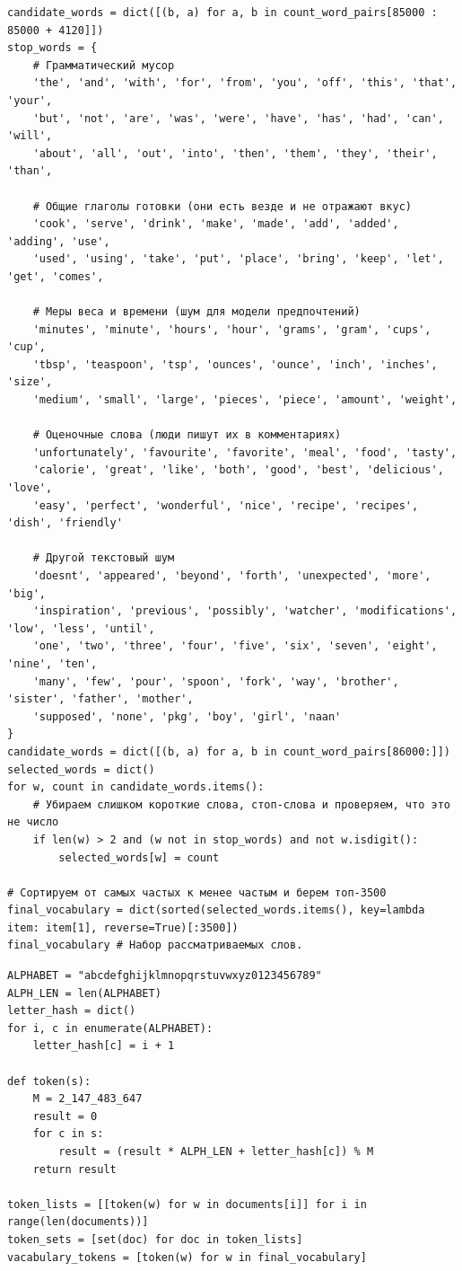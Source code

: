 \begin{lstlisting}[caption={Определение набора рассматриваемых слов}, label={lst:rvec_2}]
candidate_words = dict([(b, a) for a, b in count_word_pairs[85000 : 85000 + 4120]])
stop_words = {
    # Грамматический мусор
    'the', 'and', 'with', 'for', 'from', 'you', 'off', 'this', 'that', 'your',
    'but', 'not', 'are', 'was', 'were', 'have', 'has', 'had', 'can', 'will',
    'about', 'all', 'out', 'into', 'then', 'them', 'they', 'their', 'than',
    
    # Общие глаголы готовки (они есть везде и не отражают вкус)
    'cook', 'serve', 'drink', 'make', 'made', 'add', 'added', 'adding', 'use', 
    'used', 'using', 'take', 'put', 'place', 'bring', 'keep', 'let', 'get', 'comes',
    
    # Меры веса и времени (шум для модели предпочтений)
    'minutes', 'minute', 'hours', 'hour', 'grams', 'gram', 'cups', 'cup', 
    'tbsp', 'teaspoon', 'tsp', 'ounces', 'ounce', 'inch', 'inches', 'size',
    'medium', 'small', 'large', 'pieces', 'piece', 'amount', 'weight',
    
    # Оценочные слова (люди пишут их в комментариях)
    'unfortunately', 'favourite', 'favorite', 'meal', 'food', 'tasty', 
    'calorie', 'great', 'like', 'both', 'good', 'best', 'delicious', 'love',
    'easy', 'perfect', 'wonderful', 'nice', 'recipe', 'recipes', 'dish', 'friendly'
    
    # Другой текстовый шум
    'doesnt', 'appeared', 'beyond', 'forth', 'unexpected', 'more', 'big',
    'inspiration', 'previous', 'possibly', 'watcher', 'modifications', 'low', 'less', 'until',
    'one', 'two', 'three', 'four', 'five', 'six', 'seven', 'eight', 'nine', 'ten',
    'many', 'few', 'pour', 'spoon', 'fork', 'way', 'brother', 'sister', 'father', 'mother',
    'supposed', 'none', 'pkg', 'boy', 'girl', 'naan'
}
candidate_words = dict([(b, a) for a, b in count_word_pairs[86000:]])
selected_words = dict()
for w, count in candidate_words.items():
    # Убираем слишком короткие слова, стоп-слова и проверяем, что это не число
    if len(w) > 2 and (w not in stop_words) and not w.isdigit():
        selected_words[w] = count

# Сортируем от самых частых к менее частым и берем топ-3500
final_vocabulary = dict(sorted(selected_words.items(), key=lambda item: item[1], reverse=True)[:3500])
final_vocabulary # Набор рассматриваемых слов.
\end{lstlisting}

\begin{lstlisting}[caption={Преобразование слов в числовые токены для ускорения работы}, label={lst:rvec_3}]
ALPHABET = "abcdefghijklmnopqrstuvwxyz0123456789"
ALPH_LEN = len(ALPHABET)
letter_hash = dict()
for i, c in enumerate(ALPHABET):
    letter_hash[c] = i + 1

def token(s):
    M = 2_147_483_647
    result = 0
    for c in s:
        result = (result * ALPH_LEN + letter_hash[c]) % M
    return result

token_lists = [[token(w) for w in documents[i]] for i in range(len(documents))]
token_sets = [set(doc) for doc in token_lists]
vacabulary_tokens = [token(w) for w in final_vocabulary]
\end{lstlisting}

